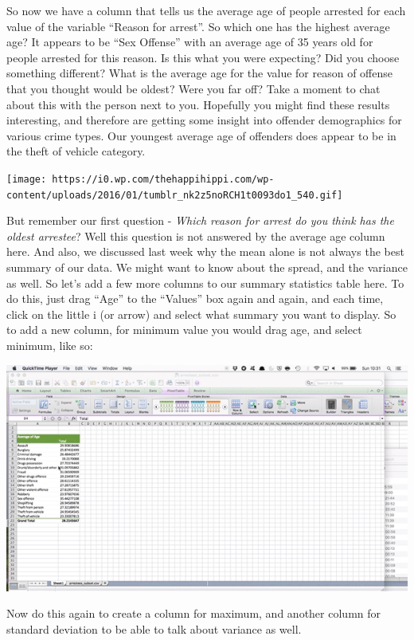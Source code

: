 \documentclass[
]{book}
\begin{document}
So now we have a column that tells us the average age of people arrested for each value of the variable ``Reason for arrest''. So which one has the highest average age? It appears to be ``Sex Offense'' with an average age of 35 years old for people arrested for this reason. Is this what you were expecting? Did you choose something different? What is the average age for the value for reason of offense that you thought would be oldest? Were you far off? Take a moment to chat about this with the person next to you. Hopefully you might find these results interesting, and therefore are getting some insight into offender demographics for various crime types. Our youngest average age of offenders does appear to be in the theft of vehicle category.

\texttt{[image: https://i0.wp.com/thehappihippi.com/wp-content/uploads/2016/01/tumblr\_nk2z5noRCH1t0093do1\_540.gif]}

But remember our first question - \emph{Which reason for arrest do you think has the oldest arrestee}? Well this question is not answered by the average age column here. And also, we discussed last week why the mean alone is not always the best summary of our data. We might want to know about the spread, and the variance as well. So let's add a few more columns to our summary statistics table here. To do this, just drag ``Age'' to the ``Values'' box again and again, and each time, click on the little i (or arrow) and select what summary you want to display. So to add a new column, for minimum value you would drag age, and select minimum, like so:

\includegraphics{imgs/make_min_col.gif}

Now do this again to create a column for maximum, and another column for standard deviation to be able to talk about variance as well.
\end{document}
